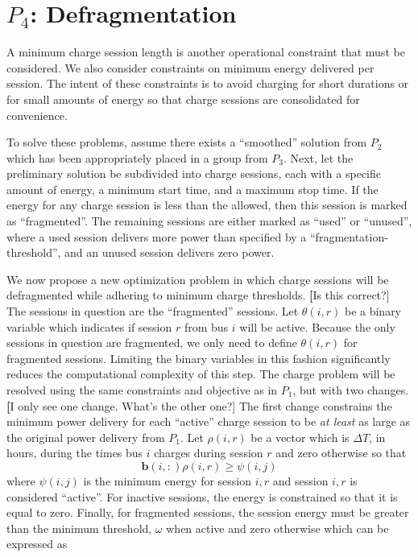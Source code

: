 \section{$P_4$: Defragmentation\label{sec:defragmentation}}
A minimum charge session length is another operational constraint that must be considered. We also consider constraints on minimum energy delivered per session. The intent of these constraints is to avoid charging for short durations or for small amounts of energy so that charge sessions are consolidated for convenience. 
\par To solve these problems, assume there exists a ``smoothed'' solution from $P_2$ which has been appropriately placed in a group from $P_3$. Next, let the preliminary solution be subdivided into charge sessions, each with a specific amount of energy, a minimum start time, and a maximum stop time. If the energy for any charge session is less than the allowed, then this session is marked as ``fragmented''.  The remaining sessions are either marked as ``used'' or ``unused'', where a used session delivers more power than specified by a ``fragmentation-threshold'', and an unused session delivers zero power. 
\par We now propose a new optimization problem in which charge sessions will be defragmented while adhering to minimum charge thresholds. {\textbf [Is this correct?]} The sessions in question are the ``fragmented'' sessions.  Let $\theta(i,r)$ be a binary variable which indicates if session $r$ from bus $i$ will be active. Because the only sessions in question are fragmented, we only need to define $\theta(i,r)$ for fragmented sessions. Limiting the binary variables in this fashion significantly reduces the computational complexity of this step.  The charge problem will be resolved using the same constraints and objective as in $P_1$, but with two changes. {\textbf [I only see one change.  What's the other one?]} The first change constrains the minimum power delivery for each ``active'' charge session to be {\it at least} as large as the original power delivery from $P_1$. Let $\rho(i,r)$ be a vector which is $\Delta T$, in hours, during the times bus $i$ charges during session $r$ and zero otherwise so that  
\begin{equation}\label{eqn:defragmentation:active}
	\mathbf{b}(i,:)\rho(i,r) \ge \psi(i,j)
\end{equation}
where $\psi(i,j)$ is the minimum energy for session $i,r$ and session $i,r$ is considered ``active''. For inactive sessions, the energy is constrained so that it is equal to zero. Finally, for fragmented sessions, the session energy must be greater than the minimum threshold, $\omega$ when active and zero otherwise which can be expressed as
